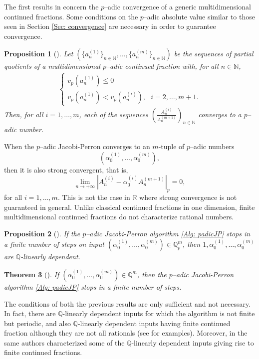 \documentclass[12pt, reqno]{amsart}
\theoremstyle{plain}
\newtheorem{Theorem}{Theorem}
\newtheorem{Proposition}[Theorem]{Proposition}
\theoremstyle{definition}
\begin{document}
The first results in \cite{MT1} concern the $p$--adic convergence of a generic multidimensional continued fractions. Some conditions on the $p$--adic absolute value similar to those seen in Section \ref{Sec: convergence} are necessary in order to guarantee convergence.

\begin{Proposition}[\cite{MT1}]
Let $(\{a_n^{(1)}\}_{n\in\mathbb{N}},\ldots,\{a_n^{(m)}\}_{n\in\mathbb{N}})$ be the sequences of partial quotients of a multidimensional $p$--adic continued fraction with, for all $n\in\mathbb{N}$,
\begin{align*}
\begin{cases}
v_p(a_n^{(1)})\leq 0\\
v_p(a_n^{(1)})<v_p(a_n^{(i)}), \ \ \ i=2,\ldots,m+1.
\end{cases}
\end{align*}
Then, for all $i=1,\ldots,m$, each of the sequences $\left(\frac{A_n^{(i)}}{A_n^{(m+1)}}\right)_{n\in\mathbb{N}}$ converges to a $p$--adic number.
\end{Proposition}
When the $p$--adic Jacobi-Perron converges to an $m$-tuple of $p$--adic numbers
\[(\alpha_0^{(1)},\ldots,\alpha_0^{(m)}),\]
then it is also strong convergent, that is,
\[\lim_{n\rightarrow +\infty}|A_n^{(i)}-\alpha_0^{(i)}A_n^{(m+1)}|_p=0,\]
for all $i=1,\ldots,m$. This is not the case in $\mathbb{R}$ where strong convergence is not guaranteed in general. Unlike classical continued fractions in one dimension, finite multidimensional continued fractions do not characterize rational numbers.

\begin{Proposition}[\cite{MT1}]
If the $p$--adic Jacobi-Perron algorithm \eqref{Alg: padicJP} stops in a finite number of steps on input $(\alpha_0^{(1)},\ldots,\alpha_0^{(m)})\in\mathbb{Q}_p^m$, then $1,\alpha_0^{(1)},\ldots,\alpha_0^{(m)}$ are $\mathbb{Q}$-linearly dependent.
\end{Proposition}

\begin{Theorem}[\cite{MT1}]\label{Thm: finitejp}
If $(\alpha_0^{(1)},\ldots,\alpha_0^{(m)})\in\mathbb{Q}^m$, then the $p$--adic Jacobi-Perron algorithm \eqref{Alg: padicJP} stops in a finite number of steps.
\end{Theorem}
The conditions of both the previous results are only sufficient and not necessary. In fact, there are $\mathbb{Q}$-linearly dependent inputs for which the algorithm is not finite but periodic, and also $\mathbb{Q}$-linearly dependent inputs having finite continued fraction although they are not all rationals (see \cite{MT1} for examples). Moreover, in \cite{MT2} the same authors characterized some of the $\mathbb{Q}$-linearly dependent inputs giving rise to finite continued fractions.
\end{document}
